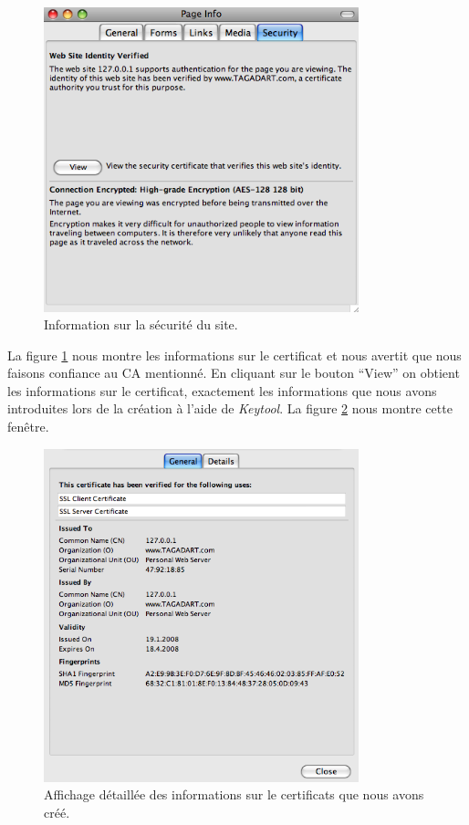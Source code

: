 \documentclass[10pt,a4paper,titlepage]{article}
\begin{document}
\begin{figure}[htbp]
   \begin{center}
      \includegraphics[width=345px]{img/3.png}
   \end{center}
   \caption{Information sur la sécurité du site.}
	\label{fig:infosecu}
\end{figure}

La figure \ref{fig:infosecu} nous montre les informations sur le certificat et nous avertit que nous faisons confiance au CA mentionné. En cliquant sur le bouton “View” on obtient les informations sur le certificat, exactement les informations que nous avons introduites lors de la création à l'aide de \emph{Keytool}. La figure \ref{fig:certif} nous montre cette fenêtre.

\begin{figure}[htbp]
   \begin{center}
      \includegraphics[width=345px]{img/4.png}
   \end{center}
   \caption{Affichage détaillée des informations sur le certificats que nous avons créé.}
	\label{fig:certif}
\end{figure}
\end{document}
